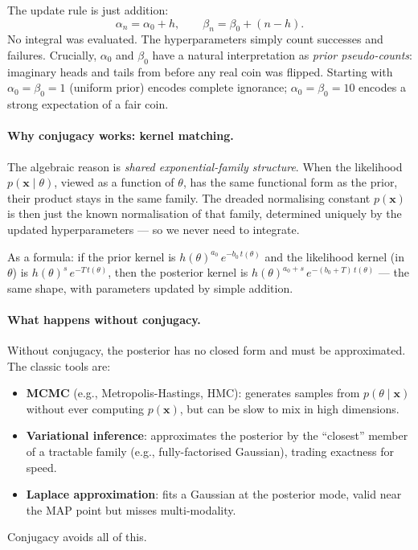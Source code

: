 \documentclass[11pt, a4paper]{article}
\theoremstyle{definition}
\begin{document}
The update rule is just addition:
\begin{equation}
  \alpha_n = \alpha_0 + h, \qquad \beta_n = \beta_0 + (n-h).
  \label{eq:beta_update}
\end{equation}
No integral was evaluated.  The hyperparameters simply count successes and
failures.  Crucially, $\alpha_0$ and $\beta_0$ have a natural interpretation
as \emph{prior pseudo-counts}: imaginary heads and tails from before any
real coin was flipped.  Starting with $\alpha_0=\beta_0=1$ (uniform prior)
encodes complete ignorance; $\alpha_0=\beta_0=10$ encodes a strong
expectation of a fair coin.

\paragraph{Why conjugacy works: kernel matching.}

The algebraic reason is \emph{shared exponential-family structure}.
When the likelihood $p(\mathbf{x}\mid\theta)$, viewed as a function of
$\theta$, has the same functional form as the prior, their product stays in
the same family.  The dreaded normalising constant $p(\mathbf{x})$ is then
just the known normalisation of that family, determined uniquely by the
updated hyperparameters — so we never need to integrate.

As a formula: if the prior kernel is $h(\theta)^{a_0}\,e^{-b_0\,t(\theta)}$
and the likelihood kernel (in $\theta$) is $h(\theta)^{s}\,e^{-T\,t(\theta)}$,
then the posterior kernel is $h(\theta)^{a_0+s}\,e^{-(b_0+T)\,t(\theta)}$ —
the same shape, with parameters updated by simple addition.

\paragraph{What happens without conjugacy.}

Without conjugacy, the posterior has no closed form and must be approximated.
The classic tools are:
\begin{itemize}[nosep]
  \item \textbf{MCMC} (e.g., Metropolis-Hastings, HMC): generates samples
    from $p(\theta\mid\mathbf{x})$ without ever computing $p(\mathbf{x})$,
    but can be slow to mix in high dimensions.
  \item \textbf{Variational inference}: approximates the posterior by the
    ``closest'' member of a tractable family (e.g., fully-factorised Gaussian),
    trading exactness for speed.
  \item \textbf{Laplace approximation}: fits a Gaussian at the posterior mode,
    valid near the MAP point but misses multi-modality.
\end{itemize}
Conjugacy avoids all of this.
\end{document}
